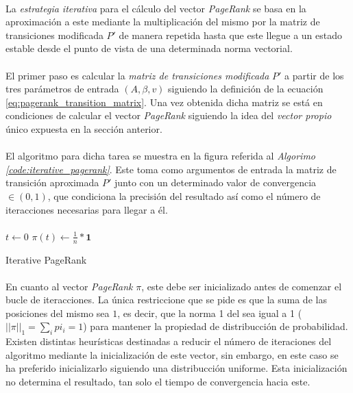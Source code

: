 \documentclass{subfiles}
\begin{document}
        \paragraph{}
        La \emph{estrategia iterativa} para el cálculo del vector \emph{PageRank} se basa en la aproximación a este mediante la multiplicación del mismo por la matriz de transiciones modificada $P'$ de manera repetida hasta que este llegue a un estado estable desde el punto de vista de una determinada norma vectorial.

        \paragraph{}
        El primer paso es calcular la \emph{matriz de transiciones modificada} $P'$ a partir de los tres parámetros de entrada $(A, \beta, v)$  siguiendo la definición de la ecuación \eqref{eq:pagerank_transition_matrix}. Una vez obtenida dicha matriz se está en condiciones de calcular el vector \emph{PageRank} siguiendo la idea del \emph{vector propio} único expuesta en la sección anterior.

        \paragraph{}
        El algoritmo para dicha tarea se muestra en la figura referida al \emph{Algorimo \ref{code:iterative_pagerank}}. Este toma como argumentos de entrada la matriz de transición aproximada $P'$ junto con un determinado valor de convergencia $\in (0,1)$, que condiciona la precisión del resultado así como el número de iteracciones necesarias para llegar a él.

        \paragraph{}
        \begin{algorithm}
          \SetAlgoLined
          $t \gets 0$\;
          $\pi(t) \gets \frac{1}{n}*\boldsymbol{1}$\;
          \caption{Iterative PageRank}
          \label{code:iterative_pagerank}
        \end{algorithm}

        \paragraph{}
        En cuanto al vector \emph{PageRank} $\pi$, este debe ser inicializado antes de comenzar el bucle de iteracciones. La única restriccione que se pide es que la suma de las posiciones del mismo sea $1$, es decir, que la norma 1 del sea igual a 1 ($||\pi||_1 = \sum_i pi_i = 1$) para mantener la propiedad de distribucción de probabilidad. Existen distintas heurísticas destinadas a reducir el número de iteraciones del algoritmo mediante la inicialización de este vector, sin embargo, en este caso se ha preferido inicializarlo siguiendo una distribucción uniforme. Esta inicialización no determina el resultado, tan solo el tiempo de convergencia hacia este.
\end{document}
